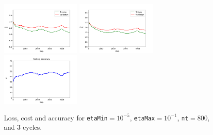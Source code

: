 \documentclass{article}
\begin{document}
	\begin{figure}[h!]
		\centering
		\includegraphics[width=4cm]{../plots/loss_init_v2.png}
		\includegraphics[width=4cm]{../plots/cost_init_v2.png}
		\includegraphics[width=4cm]{../plots/acc_init_v2.png}
		\caption{Loss, cost and accuracy for \texttt{etaMin}$=10^{-5}$, \texttt{etaMax}$=10^{-1}$, \texttt{nt}$=800$, and $3$ cycles.}
	\end{figure}\\
\end{document}
